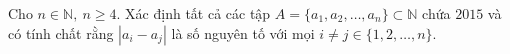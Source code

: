 \ifshowproblem
\begin{problem}\label{example:ROU-2015-JBMO-TST-D4-P1}
    Cho \( n \in \mathbb{N},\ n \geq 4 \). Xác định tất cả các tập \( A = \{a_1, a_2, \ldots, a_n\} \subset \mathbb{N} \) chứa \(2015\)
    và có tính chất rằng \( |a_i - a_j| \) là số nguyên tố với mọi \( i \ne j \in \{1, 2, \ldots, n\} \).
\end{problem}
\fi

\footnotemark
{}
\fi